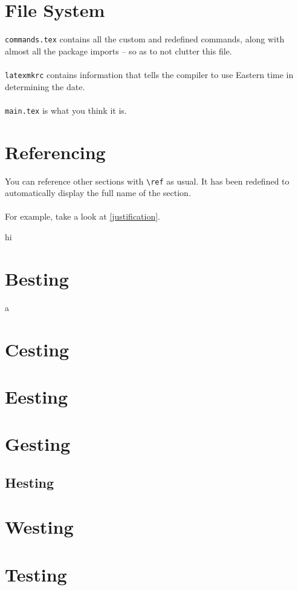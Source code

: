 \documentclass{constitution}
\begin{document}
\section{File System}
\verb|commands.tex| contains all the custom and redefined commands, along with almost all the package imports -- so as to not clutter this file.
\\\\
\verb|latexmkrc| contains information that tells the compiler to use Eastern time in determining the date.
\\\\
\verb|main.tex| is what you think it is.

\section{Referencing}
You can reference other sections with \verb|\ref| as usual.
It has been redefined to automatically display the full name of the section.
\\\\
For example, take a look at \ref{justification}.




hi
\section{Besting}
a
\section{Cesting}

\section{Eesting}

\section{Gesting}
\subsection{Hesting}

\section{Westing}

\section{Testing}
\end{document}
